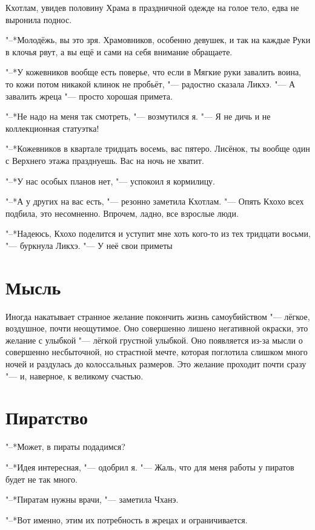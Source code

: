 \documentclass[a4paper,10pt]{book}
\newcommand{\ldotst}{\so{...}\xspace}
\begin{document}
 Кхотлам, увидев половину Храма в праздничной одежде на голое тело, едва не выронила поднос.

"--*Молодёжь, вы это зря. Храмовников, особенно девушек, и так на каждые Руки в клочья рвут, а вы ещё и сами на себя внимание обращаете.

"--*У кожевников вообще есть поверье, что если в Мягкие руки завалить воина, то кожи потом никакой клинок не пробьёт, "--- радостно сказала Ликхэ. "--- А завалить жреца "--- просто хорошая примета.

"--*Не надо на меня так смотреть, "--- возмутился я. "--- Я не дичь и не коллекционная статуэтка!

"--*Кожевников в квартале тридцать восемь, вас пятеро. Лисёнок, ты вообще один с Верхнего этажа празднуешь. Вас на ночь не хватит.

"--*У нас особых планов нет, "--- успокоил я кормилицу.

"--*А у других на вас есть, "--- резонно заметила Кхотлам. "--- Опять Кхохо всех подбила, это несомненно. Впрочем, ладно, все взрослые люди.
 
"--*Надеюсь, Кхохо поделится и уступит мне хоть кого-то из тех тридцати восьми, "--- буркнула Ликхэ. "--- У неё свои приметы\ldotst
 
 \section{Мысль}

 Иногда накатывает странное желание покончить жизнь самоубийством "--- лёгкое, воздушное, почти неощутимое. Оно совершенно лишено негативной окраски, это желание с улыбкой "--- лёгкой грустной улыбкой. Оно появляется из-за мысли о совершенно несбыточной, но страстной мечте, которая поглотила слишком много ночей и раздулась до колоссальных размеров. Это желание проходит почти сразу "--- и, наверное, к великому счастью.
 
 \section{Пиратство}

 "--*Может, в пираты подадимся?

"--*Идея интересная, "--- одобрил я. "--- Жаль, что для меня работы у пиратов будет не так много.

"--*Пиратам нужны врачи, "--- заметила Чханэ.

"--*Вот именно, этим их потребность в жрецах и ограничивается.
\end{document}
